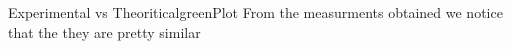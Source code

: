 \begin{prettyBox}{Experimental vs Theoritical}{greenPlot}
From the measurments obtained we notice that the they are pretty similar
\end{prettyBox}
